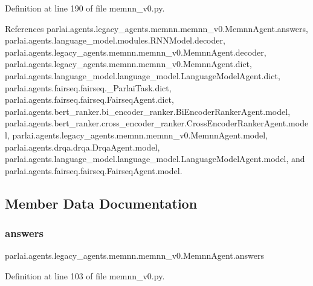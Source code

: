 Definition at line 190 of file memnn\+\_\+v0.\+py.



References parlai.\+agents.\+legacy\+\_\+agents.\+memnn.\+memnn\+\_\+v0.\+Memnn\+Agent.\+answers, parlai.\+agents.\+language\+\_\+model.\+modules.\+R\+N\+N\+Model.\+decoder, parlai.\+agents.\+legacy\+\_\+agents.\+memnn.\+memnn\+\_\+v0.\+Memnn\+Agent.\+decoder, parlai.\+agents.\+legacy\+\_\+agents.\+memnn.\+memnn\+\_\+v0.\+Memnn\+Agent.\+dict, parlai.\+agents.\+language\+\_\+model.\+language\+\_\+model.\+Language\+Model\+Agent.\+dict, parlai.\+agents.\+fairseq.\+fairseq.\+\_\+\+Parlai\+Task.\+dict, parlai.\+agents.\+fairseq.\+fairseq.\+Fairseq\+Agent.\+dict, parlai.\+agents.\+bert\+\_\+ranker.\+bi\+\_\+encoder\+\_\+ranker.\+Bi\+Encoder\+Ranker\+Agent.\+model, parlai.\+agents.\+bert\+\_\+ranker.\+cross\+\_\+encoder\+\_\+ranker.\+Cross\+Encoder\+Ranker\+Agent.\+model, parlai.\+agents.\+legacy\+\_\+agents.\+memnn.\+memnn\+\_\+v0.\+Memnn\+Agent.\+model, parlai.\+agents.\+drqa.\+drqa.\+Drqa\+Agent.\+model, parlai.\+agents.\+language\+\_\+model.\+language\+\_\+model.\+Language\+Model\+Agent.\+model, and parlai.\+agents.\+fairseq.\+fairseq.\+Fairseq\+Agent.\+model.



\subsection{Member Data Documentation}
\mbox{\label{classparlai_1_1agents_1_1legacy__agents_1_1memnn_1_1memnn__v0_1_1MemnnAgent_afe8168370453275f9d89b10a0212029d}} 
\subsubsection{\texorpdfstring{answers}{answers}}
{\footnotesize\ttfamily parlai.\+agents.\+legacy\+\_\+agents.\+memnn.\+memnn\+\_\+v0.\+Memnn\+Agent.\+answers}



Definition at line 103 of file memnn\+\_\+v0.\+py.



